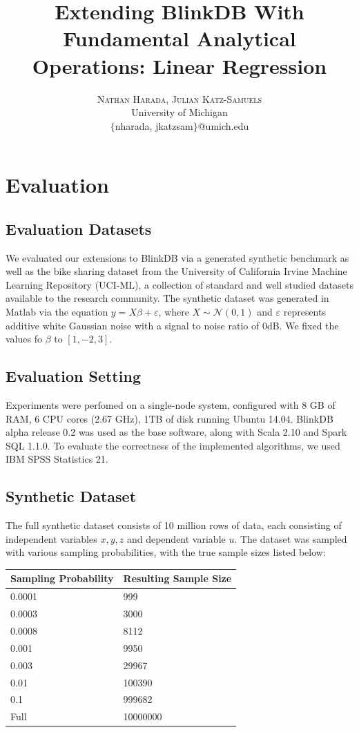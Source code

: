 \documentclass[twoside]{article}
\title{\vspace{-15mm}\fontsize{24pt}{10pt}\selectfont\textbf{Extending BlinkDB With Fundamental Analytical Operations: Linear Regression}} %
\author{
\large
\textsc{Nathan Harada, Julian Katz-Samuels}\\[2mm] %
\normalsize University of Michigan \\ %
\normalsize $\{$nharada, jkatzsam$\}$@umich.edu
\vspace{-5mm}
}
\date{}
\begin{document}
\maketitle %

\thispagestyle{fancy} %

\section{Evaluation}
\subsection{Evaluation Datasets}
We evaluated our extensions to BlinkDB via a generated synthetic benchmark as well as the bike sharing dataset from the University of California Irvine Machine Learning Repository (UCI-ML), a collection of standard and well studied datasets available to the research community. The synthetic dataset was generated in Matlab via the equation $y=X\beta + \varepsilon$, where $X\sim\mathcal{N}\left(0,1\right)$ and $\varepsilon$ represents additive white Gaussian noise with a signal to noise ratio of 0dB. We fixed the values fo $\beta$ to $[1,-2,3]$.

\subsection{Evaluation Setting}
Experiments were perfomed on a single-node system, configured with 8 GB of RAM, 6 CPU cores (2.67 GHz), 1TB of disk running Ubuntu 14.04. BlinkDB alpha release 0.2 was used as the base software, along with Scala 2.10 and Spark SQL 1.1.0. To evaluate the correctness of the implemented algorithms, we used IBM SPSS Statistics 21.

\subsection{Synthetic Dataset}
The full synthetic dataset consists of 10 million rows of data, each consisting of independent variables $x,y,z$ and dependent variable $u$. The dataset was sampled with various sampling probabilities, with the true sample sizes listed below:

\begin{center}
    \begin{tabular}{| l | l |}
	\hline
	Sampling Probability & Resulting Sample Size \\
	\hline
	0.0001 & 999 \\
	0.0003 & 3000 \\
	0.0008 & 8112 \\
	0.001 & 9950 \\
	0.003 & 29967 \\
	0.01 & 100390 \\
	0.1 & 999682 \\
	Full & 10000000 \\
	\hline
    \end{tabular}
\end{center}
\end{document}
